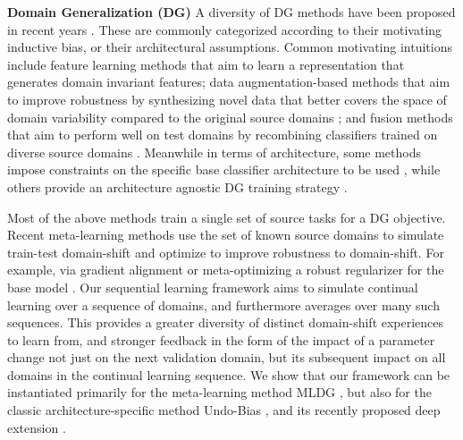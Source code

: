 \documentclass[runningheads]{llncs}
\newcommand{\keypoint}[1]{\vspace{0.1cm}\noindent\textbf{#1}\quad}
\begin{document}
\keypoint{Domain Generalization (DG)} A diversity of DG methods have been proposed in recent  years \cite{muandet2013domaingeneralization,ECCV12_Khosla,Xu2014lre,ghifary2015domain,motiian2017CCSA,da2017dg,Li2018MLDG,shiv2018dg,mmdaaecvpr2018,NIPS2018_metareg,riccardo_nips18}. These are commonly categorized according to their motivating inductive bias, or their architectural assumptions. Common motivating intuitions include feature learning methods \cite{ghifary2015domain,muandet2013domaingeneralization,mmdaaecvpr2018} that aim to learn a representation that generates domain invariant features; data augmentation-based methods that aim to improve robustness by synthesizing novel data that better covers the space of domain variability compared to the original source domains \cite{riccardo_nips18,shiv2018dg}; and fusion methods that aim to perform well on test domains by recombining classifiers trained on diverse source domains \cite{Xu2014lre,Massimiliano2018ICIP}. Meanwhile in terms of architecture, some methods impose constraints on the specific base classifier architecture to be used \cite{muandet2013domaingeneralization,ECCV12_Khosla,ghifary2015domain,da2017dg,Xu2014lre}, while others provide an architecture agnostic DG training strategy \cite{NIPS2018_metareg,shiv2018dg,riccardo_nips18}.

Most of the above methods train a single set of source tasks for a DG objective. Recent meta-learning methods use the set of known source domains to simulate train-test domain-shift and optimize to improve robustness to domain-shift. For example, via gradient alignment \cite{Li2018MLDG} or meta-optimizing a robust regularizer for the base model \cite{NIPS2018_metareg}. Our sequential learning framework aims to simulate continual learning over a sequence of domains, and furthermore averages over many such sequences. This provides a greater diversity of distinct domain-shift experiences to learn from, and stronger feedback in the form of the impact of a parameter change not just on the next validation domain, but its subsequent impact on all domains in the continual learning sequence. We show that our framework can be instantiated primarily for the meta-learning method MLDG \cite{Li2018MLDG}, but also for the classic architecture-specific method Undo-Bias \cite{ECCV12_Khosla}, and its recently proposed deep extension  \cite{da2017dg}.
\end{document}
